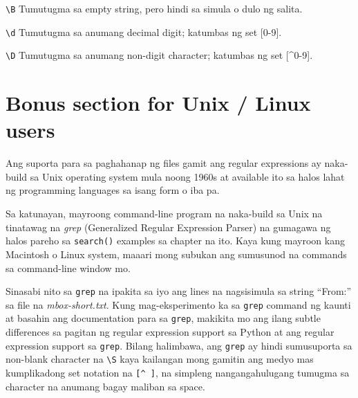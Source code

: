 \documentclass[10pt,]{book}
\newenvironment{Shaded}{}{}
\newcommand{\ExtensionTok}[1]{#1}
\newcommand{\NormalTok}[1]{#1}
\newcommand{\StringTok}[1]{\textcolor[rgb]{0.25,0.44,0.63}{#1}}
\begin{document}
\texttt{\textbackslash{}B} Tumutugma sa empty string, pero hindi sa
simula o dulo ng salita.

\texttt{\textbackslash{}d} Tumutugma sa anumang decimal digit; katumbas
ng set {[}0-9{]}.

\texttt{\textbackslash{}D} Tumutugma sa anumang non-digit character;
katumbas ng set {[}\^{}0-9{]}.

\section{Bonus section for Unix / Linux
users}\label{bonus-section-for-unix-linux-users}

Ang suporta para sa paghahanap ng files gamit ang regular expressions ay
naka-build sa Unix operating system mula noong 1960s at available ito sa
halos lahat ng programming languages sa isang form o iba pa.


Sa katunayan, mayroong command-line program na naka-build sa Unix na
tinatawag na \emph{grep} (Generalized Regular Expression Parser) na
gumagawa ng halos pareho sa \texttt{search()} examples sa chapter na
ito. Kaya kung mayroon kang Macintosh o Linux system, maaari mong
subukan ang sumusunod na commands sa command-line window mo.

\begin{Shaded}
\end{Shaded}

Sinasabi nito sa \texttt{grep} na ipakita sa iyo ang lines na
nagsisimula sa string ``From:'' sa file na \emph{mbox-short.txt}. Kung
mag-eksperimento ka sa \texttt{grep} command ng kaunti at basahin ang
documentation para sa \texttt{grep}, makikita mo ang ilang subtle
differences sa pagitan ng regular expression support sa Python at ang
regular expression support sa \texttt{grep}. Bilang halimbawa, ang
\texttt{grep} ay hindi sumusuporta sa non-blank character na
\texttt{\textbackslash{}S} kaya kailangan mong gamitin ang medyo mas
kumplikadong set notation na \texttt{{[}\^{}\ {]}}, na simpleng
nangangahulugang tumugma sa character na anumang bagay maliban sa space.
\end{document}
